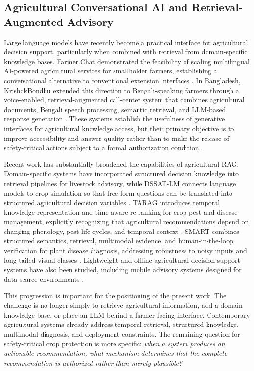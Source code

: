 \documentclass[a4paper,fleqn]{cas-dc}
\begin{document}
\subsection{Agricultural Conversational AI and Retrieval-Augmented Advisory}
Large language models have recently become a practical interface for agricultural decision support, particularly when combined with retrieval from domain-specific knowledge bases. Farmer.Chat demonstrated the feasibility of scaling multilingual AI-powered agricultural services for smallholder farmers, establishing a conversational alternative to conventional extension interfaces \citep{farmerchat2024}. In Bangladesh, KrishokBondhu extended this direction to Bengali-speaking farmers through a voice-enabled, retrieval-augmented call-center system that combines agricultural documents, Bengali speech processing, semantic retrieval, and LLM-based response generation \citep{krishokbondhu2025}. These systems establish the usefulness of generative interfaces for agricultural knowledge access, but their primary objective is to improve accessibility and answer quality rather than to make the release of safety-critical actions subject to a formal authorization condition.

Recent work has substantially broadened the capabilities of agricultural RAG. Domain-specific systems have incorporated structured decision knowledge into retrieval pipelines for livestock advisory, while DSSAT-LM connects language models to crop simulation so that free-form questions can be translated into structured agricultural decision variables \citep{goatrag2026,dssatlm2026}. TARAG introduces temporal knowledge representation and time-aware re-ranking for crop pest and disease management, explicitly recognizing that agricultural recommendations depend on changing phenology, pest life cycles, and temporal context \citep{tarag2026}. SMART combines structured semantics, retrieval, multimodal evidence, and human-in-the-loop verification for plant disease diagnosis, addressing robustness to noisy inputs and long-tailed visual classes \citep{smart2026}. Lightweight and offline agricultural decision-support systems have also been studied, including mobile advisory systems designed for data-scarce environments \citep{agrotutor2020}.

This progression is important for the positioning of the present work. The challenge is no longer simply to retrieve agricultural information, add a domain knowledge base, or place an LLM behind a farmer-facing interface. Contemporary agricultural systems already address temporal retrieval, structured knowledge, multimodal diagnosis, and deployment constraints. The remaining question for safety-critical crop protection is more specific: \emph{when a system produces an actionable recommendation, what mechanism determines that the complete recommendation is authorized rather than merely plausible?}
\end{document}
